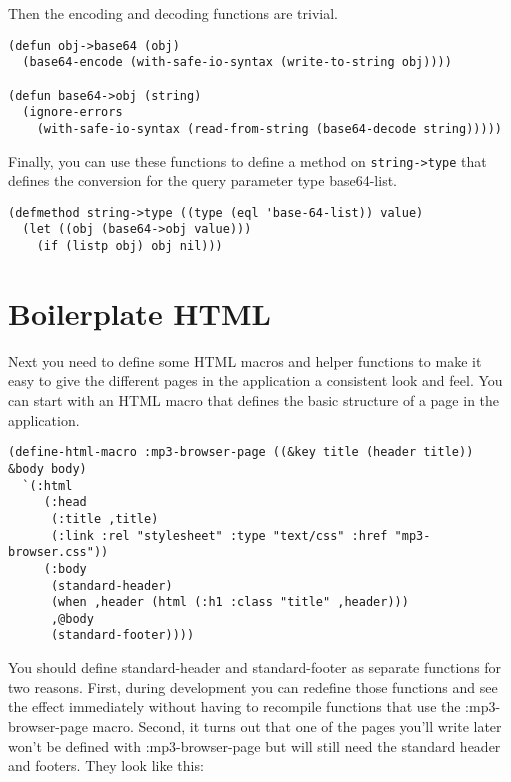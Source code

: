 Then the encoding and decoding functions are trivial.

\begin{lstlisting}
(defun obj->base64 (obj)
  (base64-encode (with-safe-io-syntax (write-to-string obj))))

(defun base64->obj (string)
  (ignore-errors
    (with-safe-io-syntax (read-from-string (base64-decode string)))))
\end{lstlisting}

Finally, you can use these functions to define a method on \lstinline!string->type! that
defines the conversion for the query parameter type base64-list.

\begin{lstlisting}
(defmethod string->type ((type (eql 'base-64-list)) value)
  (let ((obj (base64->obj value)))
    (if (listp obj) obj nil)))
\end{lstlisting}

\section{Boilerplate HTML}

Next you need to define some HTML macros and helper functions to make it easy to give the
different pages in the application a consistent look and feel. You can start with an HTML
macro that defines the basic structure of a page in the application.

\begin{lstlisting}
(define-html-macro :mp3-browser-page ((&key title (header title)) &body body)
  `(:html
     (:head
      (:title ,title)
      (:link :rel "stylesheet" :type "text/css" :href "mp3-browser.css"))
     (:body
      (standard-header)
      (when ,header (html (:h1 :class "title" ,header)))
      ,@body
      (standard-footer))))
\end{lstlisting}

You should define standard-header and standard-footer as separate functions for two
reasons. First, during development you can redefine those functions and see the effect
immediately without having to recompile functions that use the :mp3-browser-page
macro. Second, it turns out that one of the pages you'll write later won't be defined with
:mp3-browser-page but will still need the standard header and footers. They look like
this:

